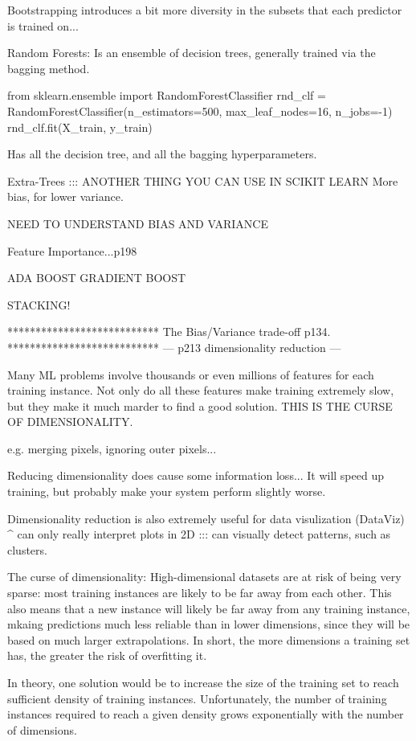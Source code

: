 Bootstrapping introduces a bit more diversity in the subsets that each predictor is trained on...

Random Forests:
Is an ensemble of decision trees, generally trained via the bagging method.

from sklearn.ensemble import RandomForestClassifier
rnd_clf = RandomForestClassifier(n_estimators=500, max_leaf_nodes=16, n_jobs=-1)
rnd_clf.fit(X_train, y_train)

Has all the decision tree, and all the bagging hyperparameters.

Extra-Trees ::: ANOTHER THING YOU CAN USE IN SCIKIT LEARN
More bias, for lower variance.

NEED TO UNDERSTAND BIAS AND VARIANCE

Feature Importance...p198

ADA BOOST
GRADIENT BOOST

STACKING!

***************************
The Bias/Variance trade-off
p134.
***************************
---
p213 dimensionality reduction
---

Many ML problems involve thousands or even millions of features for each training instance.
Not only do all these features make training extremely slow,
but they make it much marder to find a good solution.
THIS IS THE CURSE OF DIMENSIONALITY.

e.g. merging pixels, ignoring outer pixels...

Reducing dimensionality does cause some information loss...
It will speed up training, but probably make your system perform slightly worse.

Dimensionality reduction is also extremely useful for data visulization (DataViz)
^ can only really interpret plots in 2D ::: can visually detect patterns, such as clusters.


The curse of dimensionality:
High-dimensional datasets are at risk of being very sparse:
most training instances are likely to be far away from each other.
This also means that a new instance will likely be far away from any training instance,
mkaing predictions much less reliable than in lower dimensions,
since they will be based on much larger extrapolations.
In short, the more dimensions a training set has,
the greater the risk of overfitting it.

In theory,
one solution would be to increase the size of the training set to reach sufficient density of training instances.
Unfortunately,
the number of training instances required to reach a given density grows exponentially with the number of dimensions.

